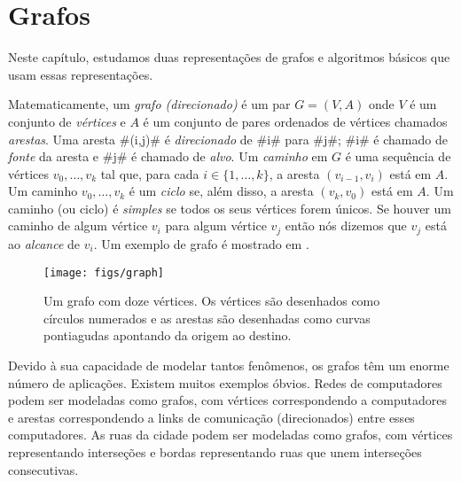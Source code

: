 \chapter{Grafos}


Neste capítulo, estudamos duas representações de grafos e algoritmos básicos que usam essas representações.  

Matematicamente, um \emph{grafo (direcionado)}
%
%
é um par $G=(V,A)$ onde
$V$ é um  conjunto de \emph{vértices}
%
e $A$ é um conjunto de pares ordenados
de vértices chamados \emph{arestas}.
%
Uma aresta #(i,j)# é \emph{direcionado}
%
de #i# para #j#;  #i# é chamado de \emph{fonte}
 da aresta e #j#
é chamado de \emph{alvo}.
  Um \emph{caminho}%
 em $G$ é uma sequência de
vértices $v_0,\ldots,v_k$ tal que, para cada $i\in\{1,\ldots,k\}$,
a aresta $(v_{i-1},v_{i})$ está em $A$.  Um caminho $v_0,\ldots,v_k$ é um
\emph{ciclo}
%
se, além disso, a aresta $(v_k,v_0)$ está em $A$.  Um caminho (ou
ciclo) é \emph{simples}
%
se todos os seus vértices forem únicos.  Se houver um caminho de 
algum vértice $v_i$ para algum vértice $v_j$ então nós dizemos que
$v_j$ está ao \emph{alcance}
 de $v_i$.  Um exemplo de grafo é mostrado 
em .

\begin{figure}
	\begin{center}
		\texttt{[image: figs/graph]}
	\end{center}
	\caption{Um grafo com doze vértices. Os vértices são desenhados como círculos numerados e as arestas são desenhadas como curvas pontiagudas apontando da origem ao destino.}
\end{figure}

Devido à sua capacidade de modelar tantos fenômenos, os grafos têm um enorme número de aplicações. Existem muitos exemplos óbvios. Redes de computadores podem ser modeladas como grafos, com vértices correspondendo a computadores e arestas correspondendo a links de comunicação (direcionados) entre esses computadores. As ruas da cidade podem ser modeladas como grafos, com vértices representando interseções e bordas representando ruas que unem interseções consecutivas.

